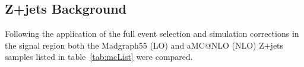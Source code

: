 

\subsection{Z+jets Background}\label{subsec:zPlusJetsEstimation}
Following the application of the full event selection and simulation corrections in the signal region both the Madgraph55 (LO) and aMC@NLO (NLO) Z+jets samples listed in table~\ref{tab:mcList} were compared.


